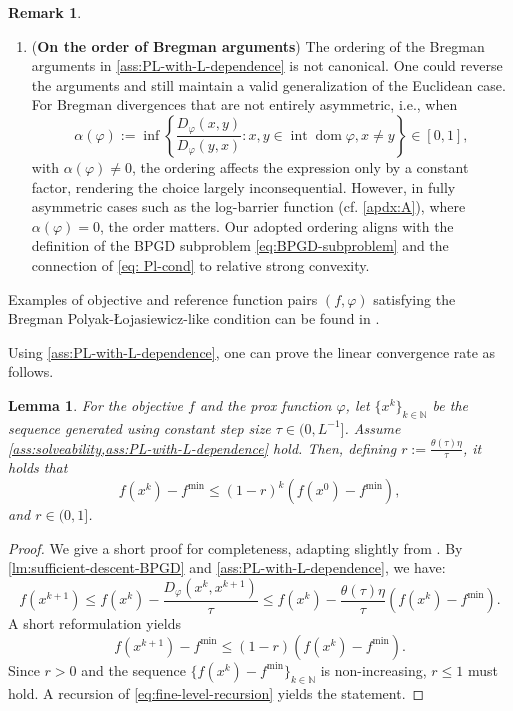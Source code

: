 \documentclass[11pt,reqno]{amsart}
\numberwithin{equation}{section}
\numberwithin{figure}{section}
\theoremstyle{plain}
\newtheorem{lemma}[theorem]{Lemma}
\theoremstyle{definition}
\newtheorem{remark}[theorem]{Remark}
\newcommand{\N}{\mathbb{N}}
\newcommand{\vphi}{\varphi}
\newcommand{\intdom}{\intr \dom}
\DeclareMathOperator{\dom}{dom}
\DeclareMathOperator{\intr}{int}
\begin{document}
\begin{remark}
\begin{enumerate}[label=(\alph*), leftmargin=*, align=left, itemsep=3pt]
    \item (\textbf{On the order of Bregman arguments})  
    The ordering of the Bregman arguments in \cref{ass:PL-with-L-dependence} is not canonical. One could reverse the arguments and still maintain a valid generalization of the Euclidean case.
    For Bregman divergences that are not entirely asymmetric, i.e., when  
    \begin{equation}
        \alpha(\vphi) := \inf \left\{ \frac{D_\vphi(x,y)}{D_\vphi(y,x)} : x,y \in \intdom \vphi, x \neq y \right\} \in [0,1],
    \end{equation}
    with $\alpha(\vphi) \neq 0$, the ordering affects the expression only by a constant factor, rendering the choice largely inconsequential. However, in fully asymmetric cases such as the log-barrier function (cf. \cref{apdx:A}), where $\alpha(\vphi) = 0$, the order matters. Our adopted ordering aligns with the definition of the BPGD subproblem \eqref{eq:BPGD-subproblem} and the connection of \eqref{eq: Pl-cond} to relative strong convexity.
\end{enumerate}
\end{remark}

Examples of objective and reference function pairs
$(f,\vphi)$ satisfying the Bregman Polyak-\L{}ojasiewicz-like condition can be found in \cite{Bauschke:19}.

Using \cref{ass:PL-with-L-dependence}, one can prove the linear convergence rate as follows.
\begin{lemma}
    For the objective $f$ and the prox function $\vphi$, let $\{x^k\}_{k \in \N}$ be the sequence generated using constant step size $\tau \in (0, L^{-1}]$. Assume \cref{ass:solveability,ass:PL-with-L-dependence} hold. Then, defining $r := \frac{\theta(\tau)\eta}{\tau}$, it holds that
    \begin{equation}
        f(x^{k}) - f^{\min} \leq (1-r)^k (f(x^0) - f^{\min}),
    \end{equation}
    and $r \in (0,1]$.
\end{lemma}
\begin{proof}
    We give a short proof for completeness, adapting slightly from \cite{Bauschke:19}. By \cref{lm:sufficient-descent-BPGD} and \cref{ass:PL-with-L-dependence}, we have:
    \begin{equation}
        f(x^{k+1}) \leq f(x^k) - \frac{D_\vphi(x^k, x^{k+1})}{\tau} \leq f(x^k) - \frac{\theta(\tau)\eta}{\tau} (f(x^k)-f^{\min}).
    \end{equation}
    A short reformulation yields
    \begin{equation} \label{eq:fine-level-recursion}
        f(x^{k+1}) - f^{\min} \leq (1-r) (f(x^k)-f^{\min}).
    \end{equation}
    Since $r > 0$ and the sequence $\{f(x^k)-f^{\min}\}_{k \in \N}$ is non-increasing, $r \leq 1$ must hold. A recursion of \eqref{eq:fine-level-recursion} yields the statement.
\end{proof}
\end{document}
